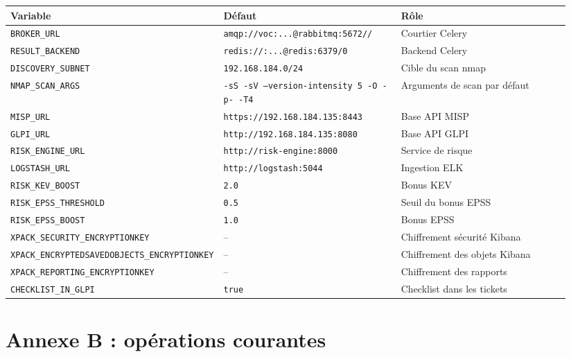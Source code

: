 \documentclass[11pt,a4paper]{article}
\begin{document}
\begin{center}
\small
\begin{longtable}{@{}p{0.30\linewidth} p{0.32\linewidth} p{0.32\linewidth}@{}}
\toprule
\textbf{Variable} & \textbf{D\'efaut} & \textbf{R\^ole} \\
\midrule
\endhead
\bottomrule
\endlastfoot
\texttt{BROKER\_URL} & \texttt{amqp://voc:...@rabbitmq:5672//} & Courtier Celery \\
\texttt{RESULT\_BACKEND} & \texttt{redis://:...@redis:6379/0} & Backend Celery \\
\texttt{DISCOVERY\_SUBNET} & \texttt{192.168.184.0/24} & Cible du scan nmap \\
\texttt{NMAP\_SCAN\_ARGS} & \texttt{-sS -sV --version-intensity 5 -O -p- -T4} & Arguments de scan par d\'efaut \\
\texttt{MISP\_URL} & \texttt{https://192.168.184.135:8443} & Base API MISP \\
\texttt{GLPI\_URL} & \texttt{http://192.168.184.135:8080} & Base API GLPI \\
\texttt{RISK\_ENGINE\_URL} & \texttt{http://risk-engine:8000} & Service de risque \\
\texttt{LOGSTASH\_URL} & \texttt{http://logstash:5044} & Ingestion ELK \\
\texttt{RISK\_KEV\_BOOST} & \texttt{2.0} & Bonus KEV \\
\texttt{RISK\_EPSS\_THRESHOLD} & \texttt{0.5} & Seuil du bonus EPSS \\
\texttt{RISK\_EPSS\_BOOST} & \texttt{1.0} & Bonus EPSS \\
\texttt{XPACK\_SECURITY\_ENCRYPTIONKEY} & -- & Chiffrement s\'ecurit\'e Kibana \\
\texttt{XPACK\_ENCRYPTEDSAVEDOBJECTS\_ENCRYPTIONKEY} & -- & Chiffrement des objets Kibana \\
\texttt{XPACK\_REPORTING\_ENCRYPTIONKEY} & -- & Chiffrement des rapports \\
\texttt{CHECKLIST\_IN\_GLPI} & \texttt{true} & Checklist dans les tickets \\
\bottomrule
\end{longtable}
\end{center}

\section{Annexe B : op\'erations courantes}
\end{document}
